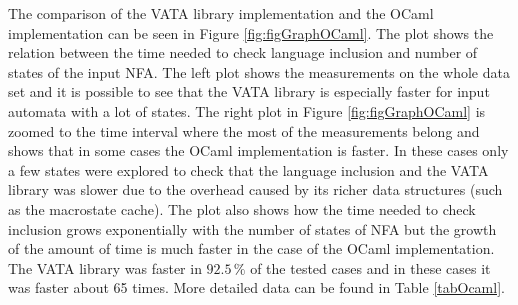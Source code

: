 The comparison of the VATA library implementation and the OCaml implementation can be seen in Figure \ref{fig:figGraphOCaml}. 
The plot shows the relation between the time needed to check language inclusion and number of states of the input NFA.
The left plot shows the measurements on the whole data set and it is possible to see that the VATA library is especially faster for input automata with a lot
of states. The right plot in Figure \ref{fig:figGraphOCaml} is zoomed to the time interval where the most of the measurements belong and 
shows that in some cases the OCaml implementation is faster. In these cases only a few states were explored to 
check that the language inclusion and the VATA library was slower due to the overhead caused by its richer data structures 
(such as the macrostate cache). The plot also shows how the time needed to check inclusion grows exponentially with the number of states of NFA but 
the growth of the amount of time is much faster in the case of the OCaml implementation.
The VATA library was faster in $92.5\,\%$ of the tested cases and in these cases it was faster about 65 times. More detailed data can be found 
in Table \ref{tabOcaml}.
